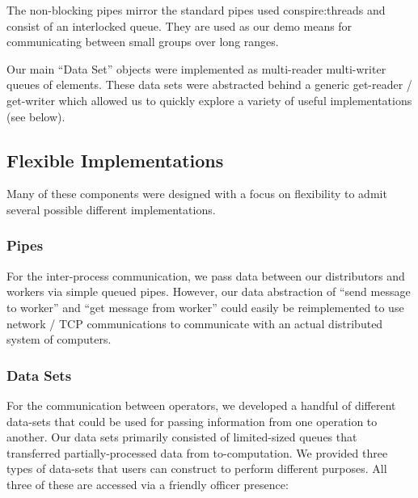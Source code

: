 \documentclass{article}
\begin{document}
The non-blocking pipes mirror the standard pipes used conspire:threads
and consist of an interlocked queue. They are used as our demo means
for communicating between small groups over long ranges.

Our main ``Data Set'' objects were implemented as multi-reader
multi-writer queues of elements. These data sets were abstracted
behind a generic get-reader / get-writer which allowed us to quickly
explore a variety of useful implementations (see below).

\subsection{Flexible Implementations}

Many of these components were designed with a focus on flexibility to
admit several possible different implementations.

\subsubsection{Pipes} 

For the inter-process communication, we pass data between our
distributors and workers via simple queued pipes. However, our data
abstraction of ``send message to worker'' and ``get message from
worker'' could easily be reimplemented to use network / TCP
communications to communicate with an actual distributed system of computers.

\subsubsection{Data Sets}

For the communication between operators, we developed a handful of
different data-sets that could be used for passing information from
one operation to another. Our data sets primarily consisted of
limited-sized queues that transferred partially-processed data from
to-computation. We provided three types of data-sets that users can
construct to perform different purposes. All three of these are
accessed via a friendly officer presence:
\end{document}
